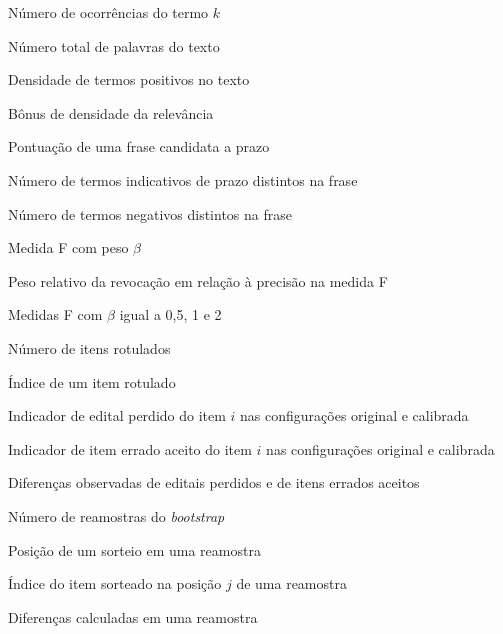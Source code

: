 \begin{simbolos}
  \item[$n_k$]                    Número de ocorrências do termo $k$
  \item[$N$]                      Número total de palavras do texto
  \item[$\rho$]                   Densidade de termos positivos no texto
  \item[$B(\rho)$]                Bônus de densidade da relevância
  \item[$S$]                      Pontuação de uma frase candidata a prazo
  \item[$n_{\mathrm{pos}}$]       Número de termos indicativos de prazo
                                  distintos na frase
  \item[$n_{\mathrm{neg}}$]       Número de termos negativos distintos na frase
  \item[$F_{\beta}$]              Medida F com peso $\beta$
  \item[$\beta$]                  Peso relativo da revocação em relação à
                                  precisão na medida F
  \item[$F_{0{,}5}$, $F_1$, $F_2$] Medidas F com $\beta$ igual a 0,5, 1 e 2
  \item[$n$]                      Número de itens rotulados
  \item[$i$]                      Índice de um item rotulado
  \item[$p_i^{o}$, $p_i^{c}$]     Indicador de edital perdido do item $i$ nas
                                  configurações original e calibrada
  \item[$e_i^{o}$, $e_i^{c}$]     Indicador de item errado aceito do item $i$
                                  nas configurações original e calibrada
  \item[$\Delta_p$, $\Delta_e$]   Diferenças observadas de editais perdidos e
                                  de itens errados aceitos
  \item[$M$]                      Número de reamostras do \textit{bootstrap}
  \item[$j$]                      Posição de um sorteio em uma reamostra
  \item[$i_j^{*}$]                Índice do item sorteado na posição $j$ de
                                  uma reamostra
  \item[$\Delta_p^{*}$, $\Delta_e^{*}$] Diferenças calculadas em uma reamostra
\end{simbolos}

